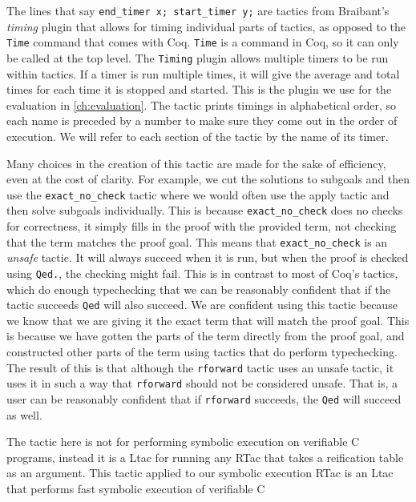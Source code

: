 \documentclass{puthesis}
\begin{document}
The lines that say \lstinline|end_timer x; start_timer y;| are tactics
from Braibant's \emph{timing} plugin that allows for timing individual
parts of tactics, as opposed to the \lstinline|Time| command that
comes with Coq. \lstinline|Time| is a command in Coq, so it can only
be called at the top level. The \lstinline|Timing| plugin allows
multiple timers to be run within tactics. If a timer is run multiple
times, it will give the average and total times for each time it is
stopped and started. This is the plugin we use for the evaluation in
\ref{ch:evaluation}. The tactic prints timings in alphabetical order,
so each name is preceded by a number to make sure they come out in
the order of execution. We will refer to each section of the tactic by
the name of its timer.

Many choices in the creation of this tactic are made for the sake of
efficiency, even at the cost of clarity. For example, we cut the
solutions to subgoals and then use the
\lstinline|exact_no_check| tactic where we would often use the apply
tactic and then solve subgoals individually. This is because
\lstinline|exact_no_check| does no checks for correctness, it simply
fills in the proof with the provided term, not checking that the term
matches the proof goal. This means that \lstinline|exact_no_check| is
an \emph{unsafe} tactic. It will always succeed when it is run, but
when the proof is checked using \lstinline|Qed.|, the checking might
fail. This is in contrast to most of Coq's tactics, which do enough
typechecking that we can be reasonably confident that if the tactic
succeeds \lstinline|Qed| will also succeed. We are confident using
this tactic because we know that we are giving it the exact term that
will match the proof goal. This is because we have gotten the parts of
the term directly from the proof goal, and constructed other parts of
the term using tactics that do perform typechecking. The result of
this is that although the \lstinline|rforward| tactic uses an unsafe
tactic, it uses it in such a way that \lstinline|rforward| should not
be considered unsafe. That is, a user can be reasonably confident that
if \lstinline|rforward| succeeds, the \lstinline|Qed| will succeed as
well.


The tactic here is not for performing symbolic execution on verifiable
C programs, instead it is a Ltac for running any RTac that takes a
reification table as an argument. This tactic applied to our symbolic
execution RTac is an Ltac that performs fast symbolic execution of
verifiable C
\end{document}
